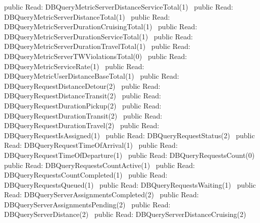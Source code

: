 public \LA{}Read: DBQueryMetricServerDistanceServiceTotal(1)~{\nwtagstyle{}}\RA{}
public \LA{}Read: DBQueryMetricServerDistanceTotal(1)~{\nwtagstyle{}}\RA{}
public \LA{}Read: DBQueryMetricServerDurationCruisingTotal(1)~{\nwtagstyle{}}\RA{}
public \LA{}Read: DBQueryMetricServerDurationServiceTotal(1)~{\nwtagstyle{}}\RA{}
public \LA{}Read: DBQueryMetricServerDurationTravelTotal(1)~{\nwtagstyle{}}\RA{}
public \LA{}Read: DBQueryMetricServerTWViolationsTotal(0)~{\nwtagstyle{}}\RA{}
public \LA{}Read: DBQueryMetricServiceRate(1)~{\nwtagstyle{}}\RA{}
public \LA{}Read: DBQueryMetricUserDistanceBaseTotal(1)~{\nwtagstyle{}}\RA{}
public \LA{}Read: DBQueryRequestDistanceDetour(2)~{\nwtagstyle{}}\RA{}
public \LA{}Read: DBQueryRequestDistanceTransit(2)~{\nwtagstyle{}}\RA{}
public \LA{}Read: DBQueryRequestDurationPickup(2)~{\nwtagstyle{}}\RA{}
public \LA{}Read: DBQueryRequestDurationTransit(2)~{\nwtagstyle{}}\RA{}
public \LA{}Read: DBQueryRequestDurationTravel(2)~{\nwtagstyle{}}\RA{}
public \LA{}Read: DBQueryRequestIsAssigned(1)~{\nwtagstyle{}}\RA{}
public \LA{}Read: DBQueryRequestStatus(2)~{\nwtagstyle{}}\RA{}
public \LA{}Read: DBQueryRequestTimeOfArrival(1)~{\nwtagstyle{}}\RA{}
public \LA{}Read: DBQueryRequestTimeOfDeparture(1)~{\nwtagstyle{}}\RA{}
public \LA{}Read: DBQueryRequestsCount(0)~{\nwtagstyle{}}\RA{}
public \LA{}Read: DBQueryRequestsCountActive(1)~{\nwtagstyle{}}\RA{}
public \LA{}Read: DBQueryRequestsCountCompleted(1)~{\nwtagstyle{}}\RA{}
public \LA{}Read: DBQueryRequestsQueued(1)~{\nwtagstyle{}}\RA{}
public \LA{}Read: DBQueryRequestsWaiting(1)~{\nwtagstyle{}}\RA{}
public \LA{}Read: DBQueryServerAssignmentsCompleted(2)~{\nwtagstyle{}}\RA{}
public \LA{}Read: DBQueryServerAssignmentsPending(2)~{\nwtagstyle{}}\RA{}
public \LA{}Read: DBQueryServerDistance(2)~{\nwtagstyle{}}\RA{}
public \LA{}Read: DBQueryServerDistanceCruising(2)~{\nwtagstyle{}}\RA{}
